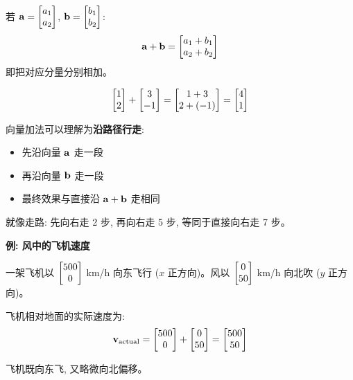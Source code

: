 \begin{center}
\end{center}

\begin{definition}
若 $\mathbf{a} = \begin{bmatrix} a_1 \\ a_2 \end{bmatrix}$, $\mathbf{b} = \begin{bmatrix} b_1 \\ b_2 \end{bmatrix}$:
\[
\mathbf{a} + \mathbf{b} = \begin{bmatrix} a_1 + b_1 \\ a_2 + b_2 \end{bmatrix}
\]
即把对应分量分别相加。
\end{definition}

\begin{example}
\[
\begin{bmatrix} 1 \\ 2 \end{bmatrix} + \begin{bmatrix} 3 \\ -1 \end{bmatrix} = \begin{bmatrix} 1+3 \\ 2+(-1) \end{bmatrix} = \begin{bmatrix} 4 \\ 1 \end{bmatrix}
\]
\end{example}

\begin{intuition}
向量加法可以理解为\textbf{沿路径行走}:
\begin{itemize}
    \item 先沿向量 $\mathbf{a}$ 走一段
    \item 再沿向量 $\mathbf{b}$ 走一段
    \item 最终效果与直接沿 $\mathbf{a} + \mathbf{b}$ 走相同
\end{itemize}

就像走路: 先向右走 2 步, 再向右走 5 步, 等同于直接向右走 7 步。
\end{intuition}

\begin{practical}
\textbf{例: 风中的飞机速度}

一架飞机以 $\begin{bmatrix} 500 \\ 0 \end{bmatrix}$ km/h 向东飞行 ($x$ 正方向)。风以 $\begin{bmatrix} 0 \\ 50 \end{bmatrix}$ km/h 向北吹 ($y$ 正方向)。

飞机相对地面的实际速度为:
\[
\mathbf{v}_{\text{actual}} = \begin{bmatrix} 500 \\ 0 \end{bmatrix} + \begin{bmatrix} 0 \\ 50 \end{bmatrix} = \begin{bmatrix} 500 \\ 50 \end{bmatrix}
\]

飞机既向东飞, 又略微向北偏移。
\end{practical}

